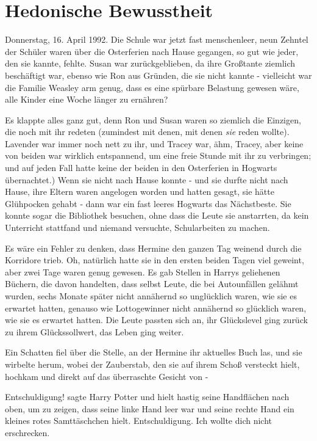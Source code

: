 \chapter{Hedonische Bewusstheit}

Donnerstag, 16. April 1992. Die Schule war jetzt fast menschenleer, neun Zehntel
der Schüler waren über die Osterferien nach Hause gegangen, so gut wie jeder,
den sie kannte, fehlte. Susan war zurückgeblieben, da ihre Großtante ziemlich
beschäftigt war, ebenso wie Ron aus Gründen, die sie nicht kannte - vielleicht
war die Familie Weasley arm genug, dass es eine spürbare Belastung gewesen wäre,
alle Kinder eine Woche länger zu ernähren?

Es klappte alles ganz gut, denn Ron und Susan waren so ziemlich die Einzigen,
die noch mit ihr redeten (zumindest mit denen, mit denen \emph{sie} reden
wollte). Lavender war immer noch nett zu ihr, und Tracey war, ähm, Tracey, aber
keine von beiden war wirklich entspannend, um eine freie Stunde mit ihr zu
verbringen; und auf jeden Fall hatte keine der beiden in den Osterferien in
Hogwarts übernachtet.) Wenn sie nicht nach Hause konnte - und sie durfte nicht
nach Hause, ihre Eltern waren angelogen worden und hatten gesagt, sie hätte
Glühpocken gehabt - dann war ein fast leeres Hogwarts das Nächstbeste. Sie
konnte sogar die Bibliothek besuchen, ohne dass die Leute sie anstarrten, da
kein Unterricht stattfand und niemand versuchte, Schularbeiten zu machen.

Es wäre ein Fehler zu denken, dass Hermine den ganzen Tag weinend durch die
Korridore trieb. Oh, natürlich hatte sie in den ersten beiden Tagen viel
geweint, aber zwei Tage waren genug gewesen. Es gab Stellen in Harrys geliehenen
Büchern, die davon handelten, dass selbst Leute, die bei Autounfällen gelähmt
wurden, sechs Monate später nicht annähernd so unglücklich waren, wie sie es
erwartet hatten, genauso wie Lottogewinner nicht annähernd so glücklich waren,
wie sie es erwartet hatten. Die Leute passten sich an, ihr Glückslevel ging
zurück zu ihrem Glückssollwert, das Leben ging weiter.

Ein Schatten fiel über die Stelle, an der Hermine ihr aktuelles Buch las, und
sie wirbelte herum, wobei der Zauberstab, den sie auf ihrem Schoß versteckt
hielt, hochkam und direkt auf das überraschte Gesicht von -

\glqq{}Entschuldigung!\grqq{} sagte Harry Potter und hielt hastig seine
Handflächen nach oben, um zu zeigen, dass seine linke Hand leer war und seine
rechte Hand ein kleines rotes Samttäschchen hielt. \glqq{}Entschuldigung. Ich
wollte dich nicht erschrecken.\grqq{}

